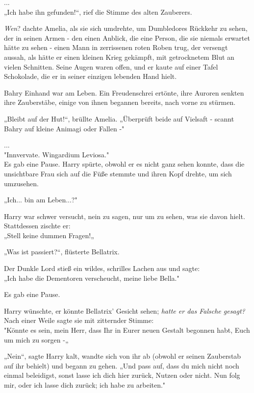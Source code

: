 {\hfill\break ...\\ „Ich habe ihn gefunden!“, rief die Stimme des alten Zauberers.

\emph{Wen}? dachte Amelia, als sie sich umdrehte, um Dumbledores Rückkehr zu sehen, der in seinen Armen - den einen Anblick, die eine Person, die sie niemals erwartet hätte zu sehen - einen Mann in zerrissenen roten Roben trug, der versengt aussah, als hätte er einen kleinen Krieg gekämpft, mit getrocknetem Blut an vielen Schnitten. Seine Augen waren offen, und er kaute auf einer Tafel Schokolade, die er in seiner einzigen lebenden Hand hielt.

Bahry Einhand war am Leben. Ein Freudenschrei ertönte, ihre Auroren senkten ihre Zauberstäbe, einige von ihnen begannen bereits, nach vorne zu stürmen.

„Bleibt auf der Hut!“, brüllte Amelia. „Überprüft beide auf Vielsaft - scannt Bahry auf kleine Animagi oder Fallen -"

...\\ "Innvervate. Wingardium Leviosa."\\ Es gab eine Pause. Harry spürte, obwohl er es nicht ganz sehen konnte, dass die unsichtbare Frau sich auf die Füße stemmte und ihren Kopf drehte, um sich umzusehen.

„Ich... bin am Leben...?"

Harry war schwer versucht, nein zu sagen, nur um zu sehen, was sie davon hielt.\\ Stattdessen zischte er:\\ „Stell keine dummen Fragen!„

„Was ist passiert?“, flüsterte Bellatrix.

Der Dunkle Lord stieß ein wildes, schrilles Lachen aus und sagte:\\ „Ich habe die Dementoren verscheucht, meine liebe Bella."

Es gab eine Pause.

Harry wünschte, er könnte Bellatrix' Gesicht sehen; \emph{hatte er das Falsche gesagt?} Nach einer Weile sagte sie mit zitternder Stimme:\\ "Könnte es sein, mein Herr, dass Ihr in Eurer neuen Gestalt begonnen habt, Euch um mich zu sorgen -„

„Nein“, sagte Harry kalt, wandte sich von ihr ab (obwohl er seinen Zauberstab auf ihr behielt) und begann zu gehen. „Und pass auf, dass du mich nicht noch einmal beleidigst, sonst lasse ich dich hier zurück, Nutzen oder nicht. Nun folg mir, oder ich lasse dich zurück; ich habe zu arbeiten."

}
